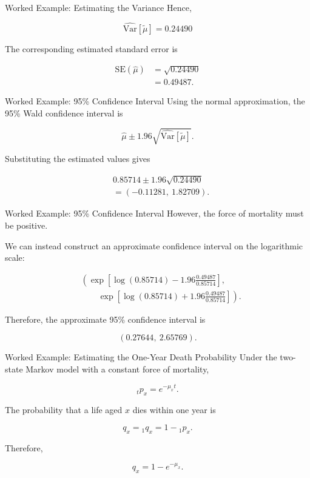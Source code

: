 \documentclass[
  ignorenonframetext,
  aspectratio=169,
]{beamer}
\begin{document}
\begin{frame}{Worked Example: Estimating the Variance}
\protect{}\label{worked-example-estimating-the-variance-1}
Hence,

\[
\boxed{
\widehat{\mathrm{Var}}[\tilde{\mu}]=0.24490
}
\]

The corresponding estimated standard error is

\[
\begin{aligned}
\mathrm{SE}(\hat{\mu})
&=\sqrt{0.24490}\\
&=0.49487.
\end{aligned}
\]
\end{frame}

\begin{frame}{Worked Example: 95\% Confidence Interval}
\protect{}\label{worked-example-95-confidence-interval}
Using the normal approximation, the 95\% Wald confidence interval is

\[
\hat{\mu}\pm1.96\sqrt{\widehat{\mathrm{Var}}[\tilde{\mu}]}.
\]

Substituting the estimated values gives

\[
\begin{aligned}
&0.85714\pm1.96\sqrt{0.24490}\\
&=(-0.11281,\ 1.82709).
\end{aligned}
\]
\end{frame}

\begin{frame}{Worked Example: 95\% Confidence Interval}
\protect{}\label{worked-example-95-confidence-interval-1}
However, the force of mortality must be positive.

We can instead construct an approximate confidence interval on the
logarithmic scale:

\[
\begin{aligned}
&\left(
\exp\left[\log(0.85714)
-1.96\frac{0.49487}{0.85714}\right],
\right.\\
&\qquad\left.
\exp\left[\log(0.85714)
+1.96\frac{0.49487}{0.85714}\right]
\right).
\end{aligned}
\]

Therefore, the approximate 95\% confidence interval is

\[
\boxed{(0.27644,\ 2.65769).}
\]
\end{frame}

\begin{frame}{Worked Example: Estimating the One-Year Death Probability}
\protect{}\label{worked-example-estimating-the-one-year-death-probability}
Under the two-state Markov model with a constant force of mortality,

\[
{}_tp_x=e^{-\mu_x t}.
\]

The probability that a life aged \(x\) dies within one year is

\[
q_x={}_1q_x=1-{}_1p_x.
\]

Therefore,

\[
q_x=1-e^{-\mu_x}.
\]
\end{frame}
\end{document}
